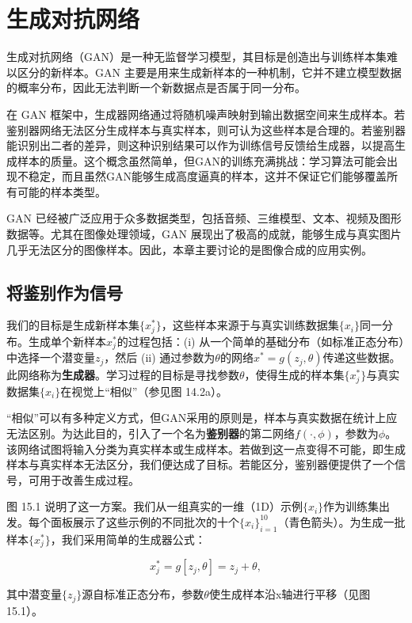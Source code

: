 \chapter{生成对抗网络}

生成对抗网络（GAN）是一种无监督学习模型，其目标是创造出与训练样本集难以区分的新样本。GAN 主要是用来生成新样本的一种机制，它并不建立模型数据的概率分布，因此无法判断一个新数据点是否属于同一分布。

在 GAN 框架中，生成器网络通过将随机噪声映射到输出数据空间来生成样本。若鉴别器网络无法区分生成样本与真实样本，则可认为这些样本是合理的。若鉴别器能识别出二者的差异，则这种识别结果可以作为训练信号反馈给生成器，以提高生成样本的质量。这个概念虽然简单，但GAN的训练充满挑战：学习算法可能会出现不稳定，而且虽然GAN能够生成高度逼真的样本，这并不保证它们能够覆盖所有可能的样本类型。

GAN 已经被广泛应用于众多数据类型，包括音频、三维模型、文本、视频及图形数据等。尤其在图像处理领域，GAN 展现出了极高的成就，能够生成与真实图片几乎无法区分的图像样本。因此，本章主要讨论的是图像合成的应用实例。

\section{将鉴别作为信号}
我们的目标是生成新样本集\(\{x_j^*\}\)，这些样本来源于与真实训练数据集\(\{x_i\}\)同一分布。生成单个新样本\(x_j^*\)的过程包括：(i) 从一个简单的基础分布（如标准正态分布）中选择一个潜变量\(z_j\)，然后 (ii) 通过参数为\(\theta\)的网络\(x^* = g(z_j, \theta)\)传递这些数据。此网络称为\textbf{生成器}。学习过程的目标是寻找参数\(\theta\)，使得生成的样本集\(\{x_j^*\}\)与真实数据集\(\{x_i\}\)在视觉上“相似”（参见图 14.2a）。

“相似”可以有多种定义方式，但GAN采用的原则是，样本与真实数据在统计上应无法区别。为达此目的，引入了一个名为\textbf{鉴别器}的第二网络\(f(\cdot, \phi)\)，参数为\(\phi\)。该网络试图将输入分类为真实样本或生成样本。若做到这一点变得不可能，即生成样本与真实样本无法区分，我们便达成了目标。若能区分，鉴别器便提供了一个信号，可用于改善生成过程。

图 15.1 说明了这一方案。我们从一组真实的一维（1D）示例\(\{x_i\}\)作为训练集出发。每个面板展示了这些示例的不同批次的十个\(\{x_i\}^{10}_{i=1}\)（青色箭头）。为生成一批样本\(\{x_j^*\}\)，我们采用简单的生成器公式：

\begin{equation}
x_j^* = g[z_j, \theta] = z_j + \theta, 
\end{equation}

其中潜变量\(\{z_j\}\)源自标准正态分布，参数\(\theta\)使生成样本沿x轴进行平移（见图 15.1）。

